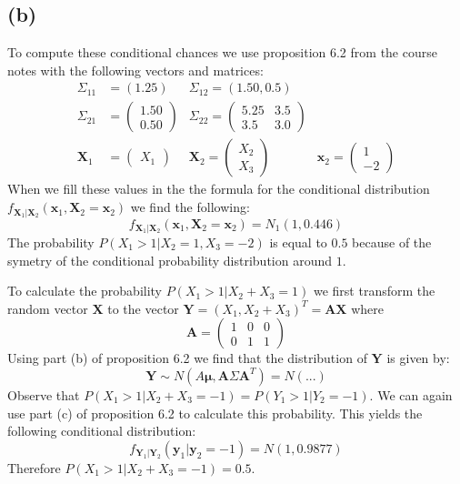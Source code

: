 \documentclass[a4paper]{article}
\begin{document}
\newpage
\subsection*{(b)}
\noindent {}

To compute these conditional chances we use proposition 6.2 from the course notes with the following vectors and matrices:
\begin{align*}
	\Sigma_{11} &= \left(1.25\right) &\Sigma_{12} = \left( 1.50, 0.5\right)\\
	\Sigma_{21} &= \begin{pmatrix} 1.50\\ 0.50 \end{pmatrix} &\Sigma_{22} = \begin{pmatrix} 5.25 & 3.5\\ 3.5 & 3.0 \end{pmatrix}\\
	\mathbf{X}_1 &= \begin{pmatrix} X_1 \end{pmatrix} &\mathbf{X}_2=\begin{pmatrix}X_2\\X_3\end{pmatrix} &\mathbf{x}_2 = \begin{pmatrix} 1\\-2 \end{pmatrix}
\end{align*}
When we fill these values in the the formula for the conditional distribution $f_{\mathbf{X}_1|\mathbf{X}_2}(\mathbf{x}_1, \mathbf{X}_2 = \mathbf{x}_2)$ we find the following:
\begin{equation}
	f_{\mathbf{X}_1|\mathbf{X}_2}(\mathbf{x}_1, \mathbf{X}_2 = \mathbf{x}_2) = N_1(1, 0.446)
\end{equation}
The probability $P(X_1>1|X_2=1, X_3=-2)$ is equal to $0.5$ because of the symetry of the conditional probability distribution around $1$.

To calculate the probability $P(X_1 > 1|X_2+X_3=1)$ we first transform the random vector $\mathbf{X}$ to the vector $\mathbf{Y} = (X_1, X_2+X_3)^T=\mathbf{A}\mathbf{X}$ where
\begin{equation*}
	\mathbf{A} = \begin{pmatrix} 1 & 0 & 0\\ 0 & 1 & 1 \end{pmatrix}
\end{equation*}
Using part (b) of proposition 6.2 we find that the distribution of $\mathbf{Y}$ is given by:
\begin{equation*}
	\mathbf{Y} \sim N(A\mathbf{\mu}, \mathbf{A}\Sigma\mathbf{A}^T) = N(...)
\end{equation*}
Observe that $P(X_1 > 1 | X_2+X_3=-1) = P(Y_1 > 1 | Y_2=-1)$. We can again use part (c) of proposition 6.2 to calculate this probability. This yields the following conditional distribution:
\begin{equation*}
	f_{\mathbf{Y}_1|\mathbf{Y}_2}(\mathbf{y}_1|\mathbf{y}_2=-1) = N(1, 0.9877)
\end{equation*}
Therefore $P(X_1 > 1 | X_2+X_3=-1)=0.5$.
\end{document}
